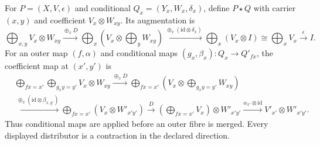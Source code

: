 \documentclass[11pt]{article}
\newcommand{\id}{\mathrm{id}}
\begin{document}
For $P=(X,V,\epsilon)$ and conditional $Q_x=(Y_x,W_x,\delta_x)$, define $P\star Q$ with carrier $(x,y)$ and coefficient $V_x\otimes W_{xy}$. Its augmentation is
\[
 \bigoplus_{x,y}V_x\otimes W_{xy}
 \xrightarrow{\oplus_xD}\bigoplus_x\left(V_x\otimes\bigoplus_yW_{xy}\right)
 \xrightarrow{\oplus_x(\id\otimes\delta_x)}\bigoplus_x(V_x\otimes I)
 \cong\bigoplus_xV_x\xrightarrow{\epsilon}I.
\]
For an outer map $(f,\alpha)$ and conditional maps $(g_x,\beta_x):Q_x\to Q'_{fx}$, the coefficient map at $(x',y')$ is
\begin{align*}
 &\bigoplus_{fx=x'}\bigoplus_{g_xy=y'}V_x\otimes W_{xy}
 \xrightarrow{\oplus_xD}
 \bigoplus_{fx=x'}\left(V_x\otimes\bigoplus_{g_xy=y'}W_{xy}\right)\\
 &\xrightarrow{\oplus_x(\id\otimes\beta_{x,y'})}
 \bigoplus_{fx=x'}(V_x\otimes W'_{x'y'})
 \xrightarrow{D}\left(\bigoplus_{fx=x'}V_x\right)\otimes W'_{x'y'}
 \xrightarrow{\alpha_{x'}\otimes\id}V'_{x'}\otimes W'_{x'y'}.
\end{align*}
Thus conditional maps are applied before an outer fibre is merged. Every displayed distributor is a contraction in the declared direction.
\end{document}
